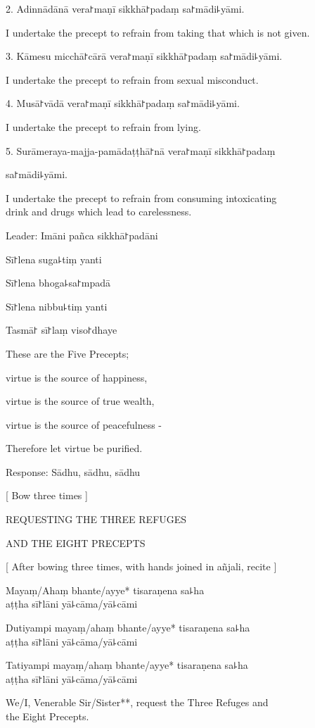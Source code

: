 2. Adinnādānā vera꜓maṇī sikkhā꜓padaṃ sa꜓mādi꜕yāmi.

I undertake the precept to refrain from taking that which is not given.

3. Kāmesu micchā꜓cārā vera꜓maṇī sikkhā꜓padaṃ sa꜓mādi꜕yāmi.

I undertake the precept to refrain from sexual misconduct.

4. Musā꜓vādā vera꜓maṇī sikkhā꜓padaṃ sa꜓mādi꜕yāmi.

I undertake the precept to refrain from lying.

5. Surāmeraya-majja-pamādaṭṭhā꜓nā vera꜓maṇī sikkhā꜓padaṃ

sa꜓mādi꜕yāmi.

I undertake the precept to refrain from consuming intoxicating \\
drink and drugs which lead to carelessness.

Leader: Imāni pañca sikkhā꜓padāni

Sī꜓lena suga꜕tiṃ yanti

Sī꜓lena bhoga꜕sa꜓mpadā

Sī꜓lena nibbu꜕tiṃ yanti

Tasmā꜓ sī꜓laṃ viso꜓dhaye

These are the Five Precepts;

virtue is the source of happiness,

virtue is the source of true wealth,

virtue is the source of peacefulness -

Therefore let virtue be purified.

Response: Sādhu, sādhu, sādhu

[ Bow three times ]

REQUESTING THE THREE REFUGES

AND THE EIGHT PRECEPTS

[ After bowing three times, with hands joined in añjali, recite ]

Mayaṃ/Ahaṃ bhante/ayye* tisaraṇena sa꜕ha \\
aṭṭha sī꜓lāni yā꜕cāma/yā꜕cāmi

Dutiyampi mayaṃ/ahaṃ bhante/ayye* tisaraṇena sa꜕ha \\
aṭṭha sī꜓lāni yā꜕cāma/yā꜕cāmi

Tatiyampi mayaṃ/ahaṃ bhante/ayye* tisaraṇena sa꜕ha \\
aṭṭha sī꜓lāni yā꜕cāma/yā꜕cāmi

We/I, Venerable Sir/Sister**, request the Three Refuges and \\
the Eight Precepts.

